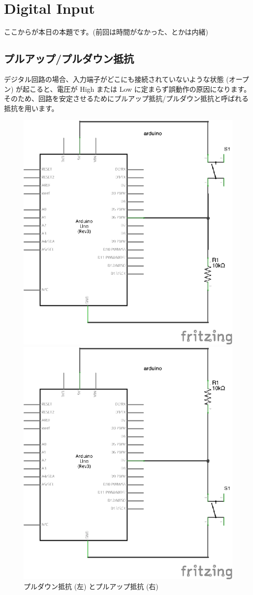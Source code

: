 \documentclass[11pt,a4paper]{jarticle}
\begin{document}
\section{Digital Input}
ここからが本日の本題です。(前回は時間がなかった、とかは内緒)

\subsection*{プルアップ/プルダウン抵抗}
デジタル回路の場合、入力端子がどこにも接続されていないような状態 (オープン) が起こると、電圧が High または Low に定まらず誤動作の原因になります。
そのため、回路を安定させるためにプルアップ抵抗/プルダウン抵抗と呼ばれる抵抗を用います。

\begin{figure}[h!]
 \begin{minipage}{0.5\columnwidth}
  \centering
  \includegraphics[width=0.7\columnwidth]{img/pulldown.eps}
 \end{minipage}
 \begin{minipage}{0.5\columnwidth}
  \centering
  \includegraphics[width=0.7\columnwidth]{img/pullup.eps}
 \end{minipage}
  \caption{プルダウン抵抗 (左) とプルアップ抵抗 (右)}
\end{figure}
\end{document}
